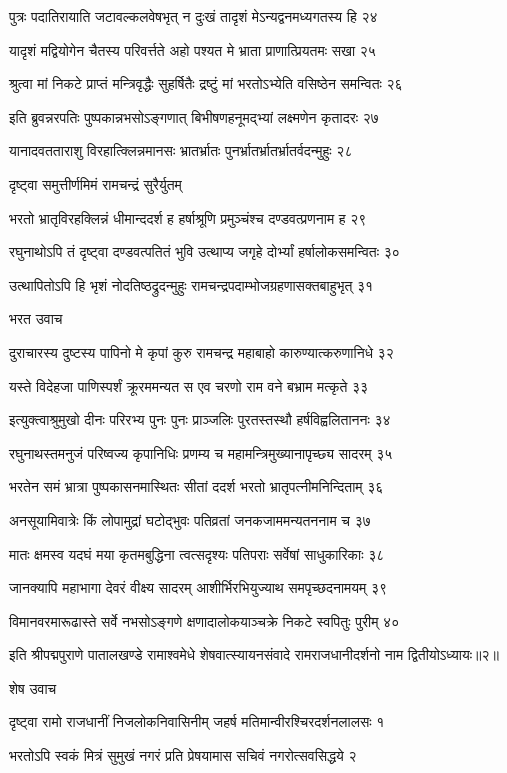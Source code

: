 पुत्रः पदातिरायाति जटावल्कलवेषभृत्
न दुःखं तादृशं मेऽन्यद्वनमध्यगतस्य हि २४

यादृशं मद्वियोगेन चैतस्य परिवर्त्तते
अहो पश्यत मे भ्राता प्राणात्प्रियतमः सखा २५

श्रुत्वा मां निकटे प्राप्तं मन्त्रिवृद्धैः सुहर्षितैः
द्रष्टुं मां भरतोऽभ्येति वसिष्ठेन समन्वितः २६

इति ब्रुवन्नरपतिः पुष्पकान्नभसोऽङ्गणात्
बिभीषणहनूमद्भ्यां लक्ष्मणेन कृतादरः २७

यानादवतताराशु विरहात्क्लिन्नमानसः
भ्रातर्भ्रातः पुनर्भ्रातर्भ्रातर्भ्रातर्वदन्मुहुः २८

दृष्ट्वा समुत्तीर्णमिमं रामचन्द्रं सुरैर्युतम्

भरतो भ्रातृविरहक्लिन्नं धीमान्ददर्श ह
हर्षाश्रूणि प्रमुञ्चंश्च दण्डवत्प्रणनाम ह २९

रघुनाथोऽपि तं दृष्ट्वा दण्डवत्पतितं भुवि
उत्थाप्य जगृहे दोर्भ्यां हर्षालोकसमन्वितः ३०

उत्थापितोऽपि हि भृशं नोदतिष्ठद्रुदन्मुहुः
रामचन्द्रपदाम्भोजग्रहणासक्तबाहुभृत् ३१

भरत उवाच

दुराचारस्य दुष्टस्य पापिनो मे कृपां कुरु
रामचन्द्र महाबाहो कारुण्यात्करुणानिधे ३२

यस्ते विदेहजा पाणिस्पर्शं क्रूरममन्यत
स एव चरणो राम वने बभ्राम मत्कृते ३३

इत्युक्त्वाश्रुमुखो दीनः परिरभ्य पुनः पुनः
प्राञ्जलिः पुरतस्तस्थौ हर्षविह्वलिताननः ३४

रघुनाथस्तमनुजं परिष्वज्य कृपानिधिः
प्रणम्य च महामन्त्रिमुख्यानापृच्छ्य सादरम् ३५

भरतेन समं भ्रात्रा पुष्पकासनमास्थितः
सीतां ददर्श भरतो भ्रातृपत्नीमनिन्दिताम् ३६

अनसूयामिवात्रेः किं लोपामुद्रां घटोद्भुवः
पतिव्रतां जनकजाममन्यतननाम च ३७

मातः क्षमस्व यदघं मया कृतमबुद्धिना
त्वत्सदृश्यः पतिपराः सर्वेषां साधुकारिकाः ३८

जानक्यापि महाभागा देवरं वीक्ष्य सादरम्
आशीर्भिरभियुज्याथ समपृच्छदनामयम् ३९

विमानवरमारूढास्ते सर्वे नभसोऽङ्गणे
क्षणादालोकयाञ्चक्रे निकटे स्वपितुः पुरीम् ४०

इति श्रीपद्मपुराणे पातालखण्डे रामाश्वमेधे शेषवात्स्यायनसंवादे रामराजधानीदर्शनो नाम द्वितीयोऽध्यायः॥२॥


शेष उवाच

दृष्ट्वा रामो राजधानीं निजलोकनिवासिनीम्
जहर्ष मतिमान्वीरश्चिरदर्शनलालसः १

भरतोऽपि स्वकं मित्रं सुमुखं नगरं प्रति
प्रेषयामास सचिवं नगरोत्सवसिद्धये २

